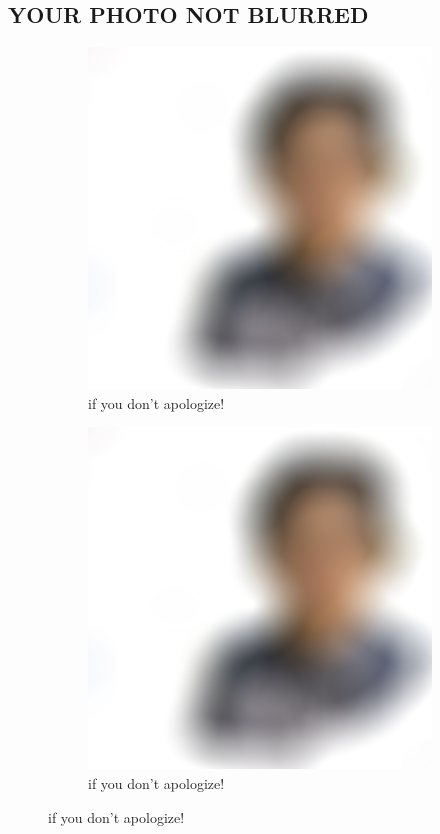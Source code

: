 \documentclass{article}
\begin{document}
\begin{center}
  \subsection*{YOUR PHOTO NOT BLURRED}
  \begin{figure}[!htp]
    \begin{subfigure}{0.5\textwidth}
    \includegraphics[scale=1]{V_RL.png}
    \caption*{if you don't apologize!}\label{fig:subim1}
    \end{subfigure}
    \begin{subfigure}{0.5\textwidth}
    \includegraphics[scale=1]{V_L.png}
    \caption*{if you don't apologize!}\label{fig:subim2}
    \end{subfigure}
  \end{figure}

\end{center}
\end{document}
